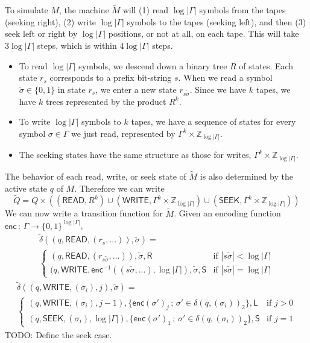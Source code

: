 \documentclass[12pt]{article}
\begin{document}
To simulate $M$, the machine $\tilde{M}$ will (1) read $\log|\Gamma|$ symbols from the tapes (seeking right), (2) write $\log|\Gamma|$ symbols to the tapes (seeking left), and then (3) seek left or right by $\log|\Gamma|$ positions, or not at all, on each tape. This will take $3\log|\Gamma|$ steps, which is within $4\log|\Gamma|$ steps. 
\begin{itemize}
\item{To read $\log|\Gamma|$ symbols, we descend down a binary tree $R$ of states. Each state $r_s$ corresponds to a prefix bit-string $s$. When we read a symbol $\tilde{\sigma} \in \{0,1\}$ in state $r_s$, we enter a new state $r_{s\tilde{\sigma}}$. Since we have $k$ tapes, we have $k$ trees represented by the product $R^k$.}
\item{To write $\log|\Gamma|$ symbols to $k$ tapes, we have a sequence of states for every symbol $\sigma \in \Gamma$ we just read, represented by $\Gamma^k \times \mathbb{Z}_{\log|\Gamma|}$.}
\item{The seeking states have the same structure as those for writes, $\Gamma^k \times \mathbb{Z}_{\log|\Gamma|}$.}
\end{itemize}
The behavior of each read, write, or seek state of $\tilde{M}$ is also determined by the active state $q$ of $M$. Therefore we can write
$$
\tilde{Q} = Q \times \left(
(\textsf{READ}, R^k) \cup
(\textsf{WRITE}, \Gamma^k \times \mathbb{Z}_{\log|\Gamma|}) \cup
(\textsf{SEEK}, \Gamma^k \times \mathbb{Z}_{\log|\Gamma|})
\right)
$$
We can now write a transition function for $\tilde{M}$. Given an encoding function $\textsf{enc} \,:\, \Gamma \rightarrow \{0,1\}^{\log|\Gamma|}$,
\begin{multline*}
\tilde{\delta}
((q, \textsf{READ}, (r_{s}, ...)), \tilde{\sigma}) = \\
\begin{cases}
(q, \textsf{READ}, (r_{s\tilde{\sigma}}, ...)), \tilde{\sigma}, \textsf{R} &
\text{if } |s\tilde{\sigma}| < \log|\Gamma| \\
(q, \textsf{WRITE}, \textsf{enc}^{-1}((s\tilde{\sigma}, ...), \log|\Gamma|), \tilde{\sigma}, \textsf{S} &
\text{if } |s\tilde{\sigma}| = \log|\Gamma|
\end{cases}
\end{multline*}
\begin{multline*}
\tilde{\delta}
((q, \textsf{WRITE}, (\sigma_i), j), \tilde{\sigma}) = \\
\begin{cases}
(q, \textsf{WRITE}, (\sigma_i), j-1), \{ \textsf{enc}(\sigma')_j \,;\, \sigma' \in \delta(q,(\sigma_i))_2 \}, \textsf{L} &
\text{if } j > 0 \\
(q, \textsf{SEEK}, (\sigma_i), \log|\Gamma|), \{ \textsf{enc}(\sigma')_1 \,;\, \sigma' \in \delta(q,(\sigma_i))_2 \}, \textsf{S} &
\text{if } j = 1
\end{cases}
\end{multline*}
TODO: Define the seek case.
\end{document}
